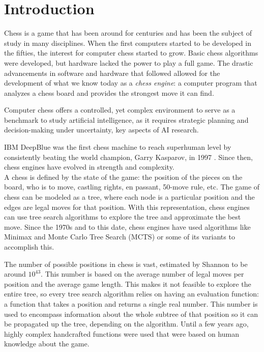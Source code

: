 \section{Introduction}

Chess is a game that has been around for centuries and has been the subject of study in many disciplines. When the first computers started to be developed in the fifties, the interest for computer chess started to grow. Basic chess algorithms were developed, but hardware lacked the power to play a full game. The drastic advancements in software and hardware that followed allowed for the development of what we know today as a \textit{chess engine}: a computer program that analyzes a chess board and provides the strongest move it can find.

Computer chess offers a controlled, yet complex environment to serve as a benchmark to study artificial intelligence, as it requires strategic planning and decision-making under uncertainty, key aspects of AI research.

IBM DeepBlue \cite{deepblue:2002} was the first chess machine to reach superhuman level by consistently beating the world champion, Garry Kasparov, in 1997 \cite{washingtonpost:1997}. Since then, chess engines have evolved in strength and complexity. \\

A chess  is defined by the state of the game: the position of the pieces on the board, who is to move, castling rights, en passant, 50-move rule, etc. The game of chess can be modeled as a tree, where each node is a particular position and the edges are legal moves for that position. With this representation, chess engines can use tree search algorithms to explore the tree and approximate the best move. Since the 1970s and to this date, chess engines have used algorithms like Minimax \cite{minimax-survey:1995} and Monte Carlo Tree Search \cite{mcts-survey:2012} (MCTS) or some of its variants \cite{tree-search-methods:2014,mcts-modifications:2022} to accomplish this.

The number of possible positions in chess is vast, estimated by Shannon \cite{shannon:1950} to be around $10^{43}$. This number is based on the average number of legal moves per position and the average game length. This makes it not feasible to explore the entire tree, so every tree search algorithm relies on having an evaluation function: a function that takes a position and returns a single real number. This number is used to encompass information about the whole subtree of that position so it can be propagated up the tree, depending on the algorithm. Until a few years ago, highly complex handcrafted functions were used that were based on human knowledge about the game. \\


